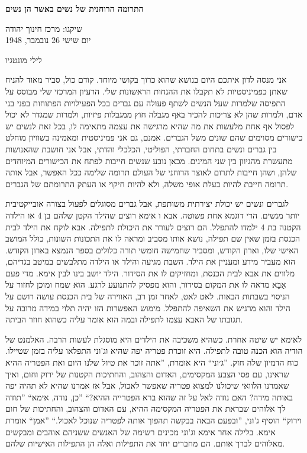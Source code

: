 \documentclass[12pt, extrafontsizes, twopage, a5paper]{memoir}
\begin{document}
{
  \centering\LARGE\bfseries התרומה הרוחנית של נשים באשר הן נשים
  
  \large שיקגו: מרכז חינוך יהודה\\יום שישי 26 נובמבר, 1948

  \Large לילי מונטגיו

  }
אני מנסה לדון איתכם היום בנושא
שהוא כרוך בקושי מיוחד. קודם כול,
סביר מאוד להניח שאתן כפמיניסטיות לא תקבלו
את ההנחות הראשונות שלי. הרעיון המרכזי שלי מבוסס על התפיסה
שלמרות שעל הנשים לשתף פעולה עם גברים בכל
הפעילויות הפתוחות בפני בני אדם, ולמרות שהן לא צריכות
להכיר באף מגבלה חוץ ממגבלות פיזיות, ולמרות שמגדר
לא יכול לפסול אף אחת מלעשות את מה שהיא
מרגישה את עצמה מתאימה לו, בכל זאת לנשים יש כישורים מסוימים
שהם שונים משל הגברים. אמנם,
גם אני פמיניסטית ומאמינה בשוויון מוחלט בין
גברים ונשים בתחום החברתי, הפוליטי, הכלכלי והדתי,
אבל אני חושבת שהאנושות מתעשרת
מהגיוון בין שני המינים. מכאן נובע שנשים חייבות
לפתח את הכישורים המיוחדים שלהן, ושהן חייבות לתרום
לאוצר הרוחני של העולם תרומה שלימה
ככל האפשר, אבל אותה תרומה חייבת להיות בעלת אופי משלה,
ולא להיות חיקוי או העתק התרומתם
של הגברים.

לגברים ונשים יש יכולת יצירתית משותפת, אבל
גברים מסוגלים לפעול בצורה אובייקטיבית יותר מנשים. הרי
דוגמא אחת פשוטה. אבא ו אימא רוצים שהילד הקטן שלהם
בן 4 או הילדה הקטנה בת 4 ילמדו להתפלל. הם רוצים
לעורר את היכולת לתפילה. אבא לוקח את הילד
לבית הכנסת בזמן שאין שם תפילה, נושא
אותו מסביב ומראה לו את התכונות השונות, כולל המושב האישי שלו,
וארון הקודש, ומסביר שחמישה חומשי תורה
כלולים בספר הנמצא בארון הקודש.
הוא מעביר מידע ומעניין את הילד. השבת
מגיעה והילד או הילדה מתלבשים במיטב בגדיהם,
מלווים את אבא לבית הכנסת, ומחזיקים לו את הסידור.
הילד יושב בינו לבין  אימא.
מדי פעם אַבָּא מראה לו את המקום בסידור, והוא מפסיק
להתנועע לרגע. הוא שמח ומוכן לחזור
על הניסוי בשבתות הבאות. לאט לאט, לאחר
זמן רב, האווירה של בית הכנסת עושה רושם
על הילד והוא מרגיש את השאיפה להתפלל.
מימוש האפשרות הזו יהיה תלוי במידה מרובה
על תגובתו של האבא עצמו לתפילה
ובמה הוא אומר עליה כשהוא חוזר הביתה.

לאימא יש שיטה אחרת. כשהיא משכיבה את הילדים היא מוסגלת לעשות
הרבה. האלמנט של הודיה הוא
הכנה טובה לתפילה. היא זוכרת פטריה יפה
שהיא וג'וני התפלאו עליה בזמן שטיילו.
כוח הדמיון שלה חזק. ''ג׳וני`` היא
אומרת, ''אתה זוכר את טיול שלנו היום ואת הפטריה ההיא
שראינו, עם פסי הצבע המקסימים, האדום והצהוב,
והחתיכות הקטנות של ירוק וחום, ואיך שאמרנו
הלוואי שיכולנו למצוא פטריה שאפשר לאכול, אבל אז אמרנו
שהיא לא תהיה יפה באותה מידה? האם נודה לאל
על זה שהוא ברא הפטרייה ההיא?“ ''כן, נודה,  אימא`` ''תודה לך
אלוהים שבראת את הפטריה המקסימה ההיא, עם האדום והצהוב,
והחתיכות של חום וירוק``  הוסיף ג'וני, ''ובפעם
הבאה בבקשה תהפוך אותה לפטריה שנוכל לאכול.`` ''אמן``
אומרת  אימא. בלילה אחר  אימא וג'וני
מכינים רשימה של האנשים ששניהם אוהבים ומבקשים מאלוהים
לברך אותם. הם מחברים יחד את התפילות ואלה הן
התפילות האישיות שלהם.
\end{document}
